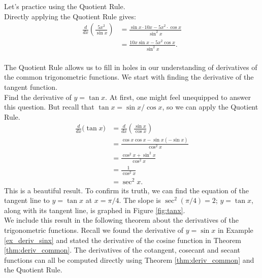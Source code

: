 Let's practice using the Quotient Rule.\\

{Directly applying the Quotient Rule gives:
	\begin{align*}
	\frac{d}{dx}\left(\frac{5x^2}{\sin x}\right) &= \frac{\sin x\cdot 10x - 5x^2\cdot \cos x}{\sin^2x} \\
																		&=	\frac{10x\sin x - 5x^2\cos x}{\sin^2 x}.
	\end{align*}
\baselineskip
}\\

The Quotient Rule allows us to fill in holes in our understanding of derivatives of the common trigonometric functions. We start with finding the derivative of the tangent function.\\

{Find the derivative of $y=\tan x$.}
{At first, one might feel unequipped to answer this question. But recall that $\tan x = \sin x/\cos x$, so we can apply the Quotient Rule.
		\begin{align*}
		\frac{d}{dx}\Big(\tan x\Big) &= \frac{d}{dx}\left(\frac{\sin x}{\cos x}\right) \\
																	&=	\frac{\cos x \cos x - \sin x (-\sin x)}{\cos^2 x} \\
																	&= \frac{\cos^2x+\sin^2x}{\cos^2x}\\
																	&= \frac{1}{\cos^2x} \\
																	&= \sec ^2 x.
		\end{align*}
This is a beautiful result. To confirm its truth, we can find the equation of the tangent line to $y=\tan x$ at $x=\pi/4$. The slope is $\sec^2(\pi/4) = 2$; $y=\tan x$, along with its tangent line, is graphed in Figure \ref{fig:tanx}.
}\\

We include this result in the following theorem about the derivatives of the trigonometric functions. Recall we found the derivative of $y=\sin x$ in Example \ref{ex_deriv_sinx} and stated the derivative of the cosine function in Theorem \ref{thm:deriv_common}. The derivatives of the cotangent, cosecant and secant functions can all be computed directly using Theorem \ref{thm:deriv_common} and the Quotient Rule.


